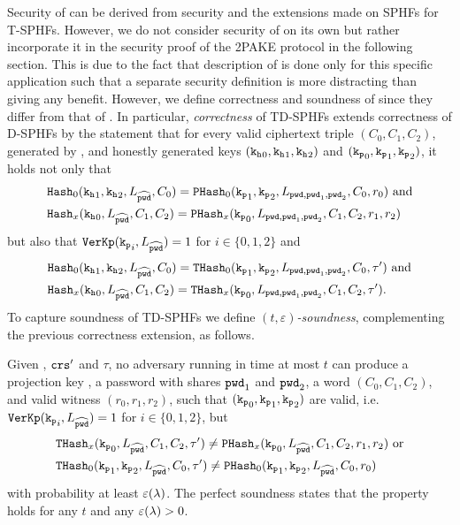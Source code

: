 \noindent
Security of \TDSPHF can be derived from \DSPHF security and the extensions made on SPHFs for T-SPHFs.
However, we do not consider security of \TDSPHF on its own but rather incorporate it in the security proof of the 2PAKE protocol in the following section.
This is due to the fact that description of \TDSPHF is done only for this specific application such that a separate security definition is more distracting than giving any benefit.
However, we define correctness and soundness of \TDSPHF since they differ from that of \DSPHF.
In particular, \emph{correctness} of TD-SPHFs extends correctness of D-SPHFs by the statement that for every  valid ciphertext triple $(C_0,C_1,C_2)$, generated by \cL, and honestly generated keys $(\mathtt{k_h}_0,\mathtt{k_h}_1,\mathtt{k_h}_2)$ and $(\mathtt{k_p}_0,\mathtt{k_p}_1,\mathtt{k_p}_2)$, it holds not only that 
\begin{align*}  
&\mathtt{Hash}_0(\mathtt{k_h}_1, \mathtt{k_h}_2, L_{\widehat{\mathtt{pwd}}}, C_0)=\mathtt{PHash}_0(\mathtt{k_p}_1, \mathtt{k_p}_2, L_{\mathtt{pwd}, \mathtt{pwd}_1, \mathtt{pwd}_2}, C_0, r_0) \text{ and} \\
&\mathtt{Hash}_x(\mathtt{k_h}_0, L_{\widehat{\mathtt{pwd}}}, C_1, C_2)=\mathtt{PHash}_x(\mathtt{k_p}_0, L_{\mathtt{pwd}, \mathtt{pwd}_1, \mathtt{pwd}_2}, C_1, C_2, r_1, r_2)
\end{align*}
but also that $\mathtt{VerKp}(\mathtt{k_p}_i, L_{\widehat{\mathtt{pwd}}})=1$ for $i\in\{0,1,2\}$ and 
\begin{align*}
&\mathtt{Hash}_0(\mathtt{k_h}_1, \mathtt{k_h}_2, L_{\widehat{\mathtt{pwd}}}, C_0)=\mathtt{THash}_0(\mathtt{k_p}_1, \mathtt{k_p}_2, L_{\mathtt{pwd}, \mathtt{pwd}_1, \mathtt{pwd}_2}, C_0, \tau') \text{ and} \\
&\mathtt{Hash}_x(\mathtt{k_h}_0, L_{\widehat{\mathtt{pwd}}}, C_1, C_2)=\mathtt{THash}_x(\mathtt{k_p}_0, L_{\mathtt{pwd}, \mathtt{pwd}_1, \mathtt{pwd}_2}, C_1, C_2, \tau').
\end{align*}
To capture soundness of TD-SPHFs we define \emph{$(t,\varepsilon)$-soundness}, complementing the previous correctness extension, as follows.

\begin{definition}\label{def:tdsphf-soundness}
Given \crs, $\mathtt{crs}'$ and $\tau$, no adversary running in time at most $t$ can produce a projection key \hp, a password \pwd with shares $\mathtt{pwd}_1$ and $\mathtt{pwd}_2$, a word $(C_0,C_1,C_2)$, and valid witness $(r_0,r_1,r_2)$, such that $(\mathtt{k_p}_0,\mathtt{k_p}_1,\mathtt{k_p}_2)$ are valid, i.e. $\mathtt{VerKp}(\mathtt{k_p}_i,L_{\widehat{\mathtt{pwd}}})=1$ for $i\in\{0,1,2\}$, but 
\begin{align*}
&\mathtt{THash}_x(\mathtt{k_p}_0,L_{\widehat{\mathtt{pwd}}},C_1, C_2, \tau')\not=\mathtt{PHash}_x(\mathtt{k_p}_0,L_{\widehat{\mathtt{pwd}}}, C_1, C_2, r_1, r_2) \text{ or} \\
&\mathtt{THash}_0(\mathtt{k_p}_1, \mathtt{k_p}_2, L_{\widehat{\mathtt{pwd}}}, C_0, \tau')\not=\mathtt{PHash}_0(\mathtt{k_p}_1, \mathtt{k_p}_2, L_{\widehat{\mathtt{pwd}}}, C_0, r_0)
\end{align*}
with probability at least $\varepsilon(\lambda)$.
The perfect soundness states that the property holds for any $t$ and any $\varepsilon(\lambda)>0$.
\end{definition} 

